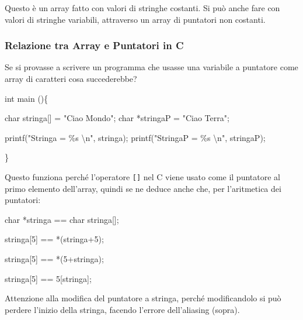 \documentclass[
]{article}
\newenvironment{Shaded}{}{}
\newcommand{\DataTypeTok}[1]{\textcolor[rgb]{0.56,0.13,0.00}{#1}}
\newcommand{\DecValTok}[1]{\textcolor[rgb]{0.25,0.63,0.44}{#1}}
\newcommand{\NormalTok}[1]{#1}
\newcommand{\SpecialCharTok}[1]{\textcolor[rgb]{0.25,0.44,0.63}{#1}}
\newcommand{\StringTok}[1]{\textcolor[rgb]{0.25,0.44,0.63}{#1}}
\begin{document}
Questo è un array fatto con valori di stringhe costanti. Si può anche
fare con valori di stringhe variabili, attraverso un array di puntatori
non costanti.

\hypertarget{header-n724}{%
\subsubsection{Relazione tra Array e Puntatori in C}\label{header-n724}}

Se si provasse a scrivere un programma che usasse una variabile a
puntatore come array di caratteri cosa succederebbe?

\begin{Shaded}
\begin{Highlighting}[]
\DataTypeTok{int}\NormalTok{ main ()\{}
	
    \DataTypeTok{char}\NormalTok{ stringa[] = }\StringTok{"Ciao Mondo"}\NormalTok{;}
	\DataTypeTok{char}\NormalTok{ *stringaP = }\StringTok{"Ciao Terra"}\NormalTok{;}
	
\NormalTok{	printf(}\StringTok{"Stringa = \%s }\SpecialCharTok{\textbackslash{}n}\StringTok{"}\NormalTok{, stringa);}
\NormalTok{	printf(}\StringTok{"StringaP = \%s }\SpecialCharTok{\textbackslash{}n}\StringTok{"}\NormalTok{, stringaP);}
	
\NormalTok{\}}
\end{Highlighting}
\end{Shaded}

Questo funziona perché l'operatore \texttt{{[}{]}} nel C viene usato
come il puntatore al primo elemento dell'array, quindi se ne deduce
anche che, per l'aritmetica dei puntatori:

\begin{Shaded}
\begin{Highlighting}[]
\DataTypeTok{char}\NormalTok{ *stringa == }\DataTypeTok{char}\NormalTok{ stringa[];}

\NormalTok{stringa[}\DecValTok{5}\NormalTok{] == *(stringa+}\DecValTok{5}\NormalTok{);}

\NormalTok{stringa[}\DecValTok{5}\NormalTok{] == *(}\DecValTok{5}\NormalTok{+stringa);}

\NormalTok{stringa[}\DecValTok{5}\NormalTok{] == }\DecValTok{5}\NormalTok{[stringa];}
\end{Highlighting}
\end{Shaded}

Attenzione alla modifica del puntatore a stringa, perché modificandolo
si può perdere l'inizio della stringa, facendo l'errore dell'aliasing
(sopra).
\end{document}

